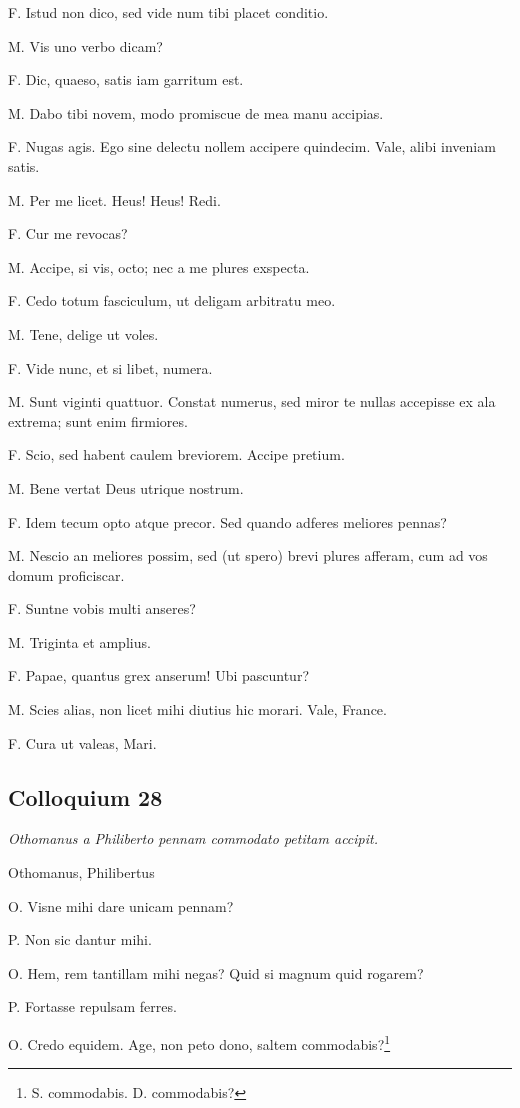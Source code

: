 \documentclass{article}
\begin{document}
F. Istud non dico, sed vide num tibi placet conditio.

M. Vis uno verbo dicam?

F. Dic, quaeso, satis iam garritum est.

M. Dabo tibi novem, modo promiscue de mea manu accipias.

F. Nugas agis. Ego sine delectu nollem accipere quindecim. Vale, alibi inveniam satis.

M. Per me licet. Heus! Heus! Redi.

F. Cur me revocas?

M. Accipe, si vis, octo; nec a me plures exspecta.

F. Cedo totum fasciculum, ut deligam arbitratu meo.

M. Tene, delige ut voles.

F. Vide nunc, et si libet, numera.

M. Sunt viginti quattuor. Constat numerus, sed miror te nullas accepisse ex ala extrema; sunt enim firmiores.

F. Scio, sed habent caulem breviorem. Accipe pretium.

M. Bene vertat Deus utrique nostrum.

F. Idem tecum opto atque precor. Sed quando adferes meliores pennas?

M. Nescio an meliores possim, sed (ut spero) brevi plures afferam, cum ad vos domum proficiscar.

F. Suntne vobis multi anseres?

M. Triginta et amplius.

F. Papae, quantus grex anserum! Ubi pascuntur?

M. Scies alias, non licet mihi diutius hic morari. Vale, France.

F. Cura ut valeas, Mari.

\subsection{Colloquium 28}
\emph{Othomanus a Philiberto pennam commodato petitam accipit.}

Othomanus, Philibertus

O. Visne mihi dare unicam pennam?

P. Non sic dantur mihi.

O. Hem, rem tantillam mihi negas? Quid si magnum quid rogarem?

P. Fortasse repulsam ferres.

O. Credo equidem. Age, non peto dono, saltem commodabis?\footnote{S. commodabis. D. commodabis?}
\end{document}
